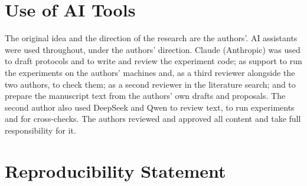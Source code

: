 \documentclass[11pt]{article}
\begin{document}
\section*{Use of AI Tools}

The original idea and the direction of the research are the authors'. AI assistants were used throughout, under the authors' direction. Claude (Anthropic) was used to draft protocols and to write and review the experiment code; as support to run the experiments on the authors' machines and, as a third reviewer alongside the two authors, to check them; as a second reviewer in the literature search; and to prepare the manuscript text from the authors' own drafts and proposals. The second author also used DeepSeek and Qwen to review text, to run experiments and for cross-checks. The authors reviewed and approved all content and take full responsibility for it.

\section*{Reproducibility Statement}
\end{document}

